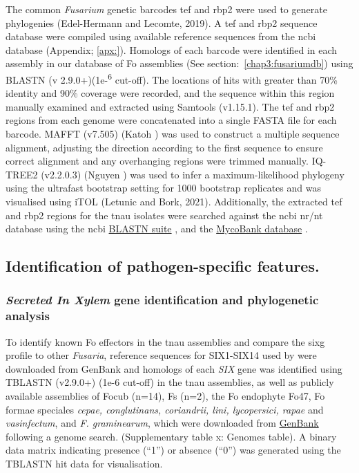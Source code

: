 The common \textit{Fusarium} genetic barcodes \ac{tef} and \ac{rbp2} were used to generate phylogenies (Edel-Hermann and Lecomte, 2019). A \ac{tef} and \ac{rbp2} sequence database were compiled using available reference sequences from the \ac{ncbi} database (Appendix; \ref{apx:}). Homologs of each barcode were identified in each assembly in our database of \ac{Fo} assemblies (See section:~\ref{chap3:fusariumdb}) using BLASTN (v 2.9.0+)(1e-\textsuperscript{6} cut-off). The locations of hits with greater than 70\% identity and 90\% coverage were recorded, and the sequence within this region manually examined and extracted using Samtools (v1.15.1). The \ac{tef} and \ac{rbp2} regions from each genome were concatenated into a single FASTA file for each barcode. MAFFT (v7.505) (Katoh ) was used to construct a multiple sequence alignment, adjusting the direction according to the first sequence to ensure correct alignment and any overhanging regions were trimmed manually. IQ-TREE2 (v2.2.0.3) (Nguyen ) was used to infer a maximum-likelihood phylogeny using the ultrafast bootstrap setting for 1000 bootstrap replicates and was visualised using iTOL (Letunic and Bork, 2021). Additionally, the extracted \ac{tef} and \ac{rbp2} regions for the \ac{tnau} isolates were searched against the \ac{ncbi} nr/nt database using the  \ac{ncbi} \href{https://blast.ncbi.nlm.nih.gov/Blast.cgi?PROGRAM=blastn&BLAST_SPEC=GeoBlast&PAGE_TYPE=BlastSearch}{BLASTN suite} \parencite{Nih2014}, and the \href{https://fusarium.mycobank.org/page/Fusarium_table}{MycoBank database} \parencite{Robert2013}. 

\subsection{Identification of pathogen-specific features.}

\subsubsection{\textit{Secreted In Xylem} gene identification and phylogenetic analysis}

To identify known \acs{Fo} effectors in the \ac{tnau} assemblies and compare the \ac{sixg} profile to other \textit{Fusaria}, reference sequences for SIX1-SIX14 used by \textcite{Czislowski2018} were downloaded from  GenBank and homologs of each \textit{SIX} gene was identified using TBLASTN (v2.9.0+) (1e-6 cut-off) in the \ac{tnau} assemblies, as well as publicly available assemblies of \ac{Focub} (n=14), \ac{Fs} (n=2), the \ac{Fo} endophyte Fo47, \ac{Fo} formae speciales \textit{cepae, conglutinans, coriandrii, lini, lycopersici,  rapae} and \textit{vasinfectum}, and \textit{F. graminearum}, which were downloaded from \href{https://www.ncbi.nlm.nih.gov/data-hub/genome/}{GenBank} following a genome search. (Supplementary table x: Genomes table). A binary data matrix indicating presence (“1”) or absence (“0”) was generated using the TBLASTN hit data for visualisation. 

